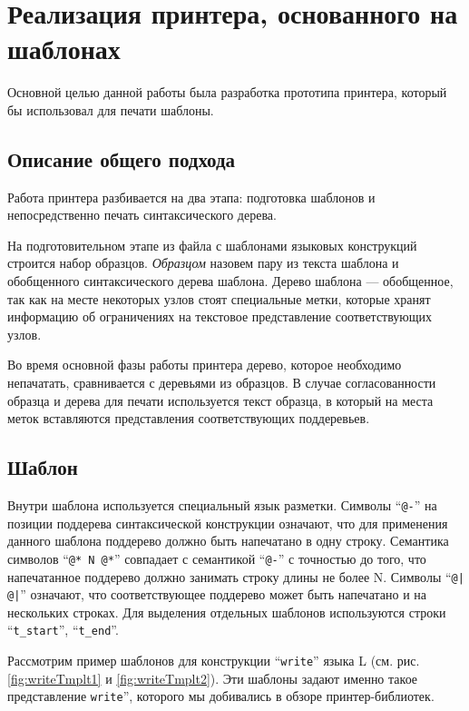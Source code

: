 \section{Реализация принтера, основанного на шаблонах}

Основной целью данной работы была разработка прототипа принтера, который бы использовал для печати шаблоны.

\subsection{Описание общего подхода}

Работа принтера разбивается на два этапа: подготовка шаблонов и непосредственно печать синтаксического дерева.

На подготовительном этапе из файла с шаблонами языковых конструкций строится набор образцов. \textit{Образцом} назовем пару из текста шаблона и обобщенного синтаксического дерева шаблона. Дерево шаблона --- обобщенное, так как на месте некоторых узлов стоят специальные метки, которые хранят информацию об ограничениях на текстовое представление соответствующих узлов.

Во время основной фазы работы принтера дерево, которое необходимо непачатать, сравнивается с деревьями из образцов. В случае согласованности образца и дерева для печати используется текст образца, в который на места меток вставляются представления соответствующих поддеревьев.


\subsection{Шаблон}

Внутри шаблона используется специальный язык разметки. Символы “\lstinline{@-}” на позиции поддерева синтаксической конструкции означают, что для применения данного шаблона поддерево должно быть напечатано в одну строку. Семантика символов “\lstinline{@* N @*}” совпадает с семантикой “\lstinline{@-}” с точностью до того, что напечатанное поддерево должно занимать строку длины не более N. Символы “\lstinline{@| @|}” означают, что соответствующее поддерево может быть напечатано и на нескольких строках. Для выделения отдельных шаблонов используются строки “\lstinline{t_start}”, “\lstinline{t_end}”.

Рассмотрим пример шаблонов для конструкции “\lstinline{write}” языка L (см. рис. \ref{fig:writeTmplt1} и \ref{fig:writeTmplt2}).
Эти шаблоны задают именно такое представление \lstinline{write}”, которого мы добивались в обзоре принтер-библиотек.

